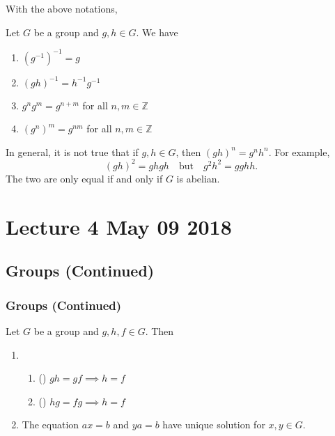 \documentclass[notoc,notitlepage]{tufte-book}
\begin{document}
With the above notations,

\begin{propo}\label{propo:group_notations}
  Let $G$ be a group and $g, h \in G$. We have 
  \begin{enumerate}
    \item $(g^{-1})^{-1} = g$
    \item $(gh)^{-1} = h^{-1} g^{-1}$
    \item $g^n g^m = g^{n + m}$ for all $n, m \in \mathbb{Z}$
    \item $(g^n)^m = g^{nm}$ for all $n, m \in \mathbb{Z}$
  \end{enumerate}
\end{propo}

\begin{warning}
  In general, it is not true that if $g, h \in G$, then $(gh)^n = g^n h^n$. For example,
  \begin{equation*}
    (gh)^2 = ghgh \quad \text{but} \quad g^2 h^2 = gghh.
  \end{equation*}
  The two are only equal if and only if $G$ is abelian.
\end{warning}




\chapter{Lecture 4 May 09 2018}
  \label{chapter:lecture_4_may_09_2018}

\section{Groups (Continued)} %
\label{sec:groups_continued}

\subsection{Groups (Continued)} %
\label{sub:groups_continued}

\begin{propo}\label{propo:cancellation_laws}
  Let $G$ be a group and $g, h, f \in G$. Then
  \begin{enumerate}
    \item \begin{enumerate}
        \item () $gh = gf \implies h = f$
        \item () $hg = fg \implies h = f$
      \end{enumerate}
    \item The equation $ax = b$ and $ya = b$ have unique solution for $x, y \in G$.
  \end{enumerate}
\end{propo}
\end{document}
